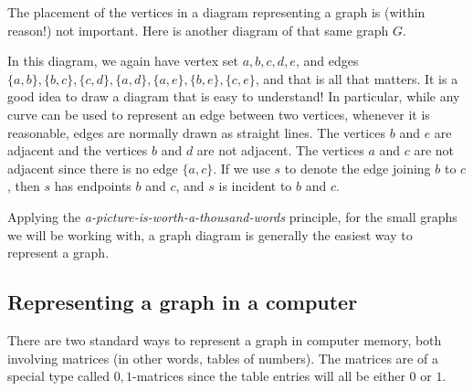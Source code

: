 The placement of the vertices in a diagram representing a graph is (within reason!) not important.
Here is another diagram of that same graph $G$. 


\begin{center}
\end{center}

In this diagram, we again have vertex set  $a,b,c,d,e$, and edges \\
$\{a,b\}, \{b,c\},\{c,d\},\{a,d\},\{a,e\},\{b,e\},\{c,e\}$, and that is all that matters. 
It is a good idea to draw a diagram that is easy to understand! In particular, while any curve can be used to represent an edge between two vertices, whenever it is reasonable, edges are normally drawn as straight lines. 
The vertices $b$ and $e$ are adjacent and the vertices $b$ and $d$ are not adjacent. The vertices $a$ and $c$ are not adjacent since there is no edge $\{a,c\}$.  If we use $s$ to denote the  edge joining $b$ to $c$, then $s$ has endpoints $b$ and $c$, and $s$ is incident to $b$ and $c$. 



Applying the {\it a-picture-is-worth-a-thousand-words} principle, for the small graphs we will be working with, a graph diagram is generally the easiest way to represent a graph.



\subsection{Representing a graph in a computer}

There are two standard ways to represent a graph in computer memory, both involving matrices (in other words, tables of numbers). The matrices are of a special type called  $0,1$-matrices since the table entries will all be either $0$ or $1$. 

